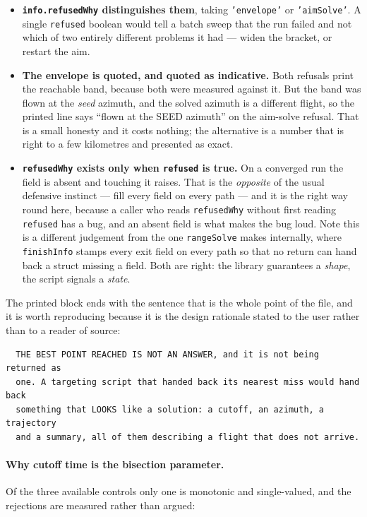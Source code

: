 \documentclass[11pt]{article}
\newcommand{\code}[1]{\texttt{#1}}
\begin{document}
\begin{itemize}
\item \textbf{\code{info.refusedWhy} distinguishes them}, taking
\code{'envelope'} or \code{'aimSolve'}. A single \code{refused} boolean would
tell a batch sweep that the run failed and not which of two entirely different
problems it had --- widen the bracket, or restart the aim.

\item \textbf{The envelope is quoted, and quoted as indicative.} Both refusals
print the reachable band, because both were measured against it. But the band
was flown at the \emph{seed} azimuth, and the solved azimuth is a different
flight, so the printed line says ``flown at the SEED azimuth'' on the
aim-solve refusal. That is a small honesty and it costs nothing; the
alternative is a number that is right to a few kilometres and presented as
exact.

\item \textbf{\code{refusedWhy} exists only when \code{refused} is true.} On a
converged run the field is absent and touching it raises. That is the
\emph{opposite} of the usual defensive instinct --- fill every field on every
path --- and it is the right way round here, because a caller who reads
\code{refusedWhy} without first reading \code{refused} has a bug, and an
absent field is what makes the bug loud. Note this is a different judgement
from the one \code{rangeSolve} makes internally, where \code{finishInfo}
stamps every exit field on every path so that no return can hand back a struct
missing a field. Both are right: the library guarantees a \emph{shape},
the script signals a \emph{state}.
\end{itemize}

The printed block ends with the sentence that is the whole point of the file,
and it is worth reproducing because it is the design rationale stated to the
user rather than to a reader of source:

\begin{lstlisting}
  THE BEST POINT REACHED IS NOT AN ANSWER, and it is not being returned as
  one. A targeting script that handed back its nearest miss would hand back
  something that LOOKS like a solution: a cutoff, an azimuth, a trajectory
  and a summary, all of them describing a flight that does not arrive.
\end{lstlisting}

\paragraph{Why cutoff time is the bisection parameter.} Of the three available
controls only one is monotonic and single-valued, and the rejections are
measured rather than argued:
\end{document}
